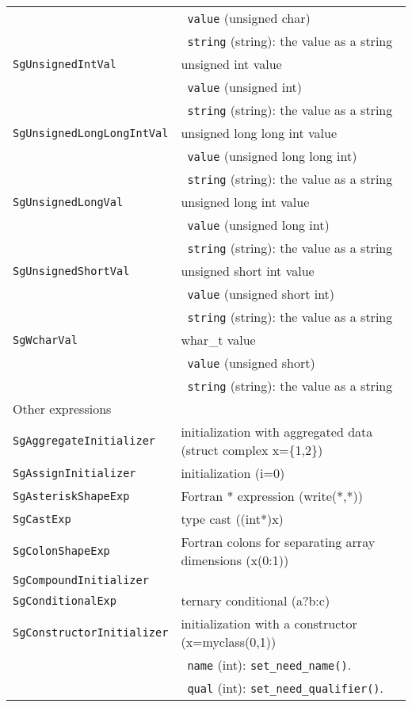 \begin{longtable}[l]{l|p{10cm}}
 & ~\texttt{value} (unsigned char) \\
 & ~\texttt{string} (string): the value as a string \\
 \texttt{SgUnsignedIntVal}& unsigned int value\\
 & ~\texttt{value} (unsigned int) \\
 & ~\texttt{string} (string): the value as a string \\
 \texttt{SgUnsignedLongLongIntVal}& unsigned long long int value\\
 & ~\texttt{value} (unsigned long long int) \\
 & ~\texttt{string} (string): the value as a string \\
 \texttt{SgUnsignedLongVal}& unsigned long int value\\
 & ~\texttt{value} (unsigned long int) \\
 & ~\texttt{string} (string): the value as a string \\
 \texttt{SgUnsignedShortVal}& unsigned short int value\\
 & ~\texttt{value} (unsigned short int) \\
 & ~\texttt{string} (string): the value as a string \\
 \texttt{SgWcharVal}& whar\_t value\\
 & ~\texttt{value} (unsigned short) \\
 & ~\texttt{string} (string): the value as a string \\
 \hline
 \multicolumn{2}{l}{Other expressions}\\
 \hline
 \texttt{SgAggregateInitializer} & initialization with aggregated data (struct complex x=\{1,2\}) \\
 \texttt{SgAssignInitializer} & initialization (i=0)\\
 \texttt{SgAsteriskShapeExp} & Fortran * expression (write(*,*))\\
 \texttt{SgCastExp} & type cast ((int*)x)\\
 \texttt{SgColonShapeExp} & Fortran colons for separating array dimensions (x(0:1))\\
 \texttt{SgCompoundInitializer} & \\
 \texttt{SgConditionalExp} & ternary conditional (a?b:c)\\
 \texttt{SgConstructorInitializer} & initialization with a constructor (x=myclass(0,1))\\
 & ~\texttt{name} (int): \texttt{set\_need\_name()}. \\
 & ~\texttt{qual} (int): \texttt{set\_need\_qualifier()}.\\

\end{longtable}
